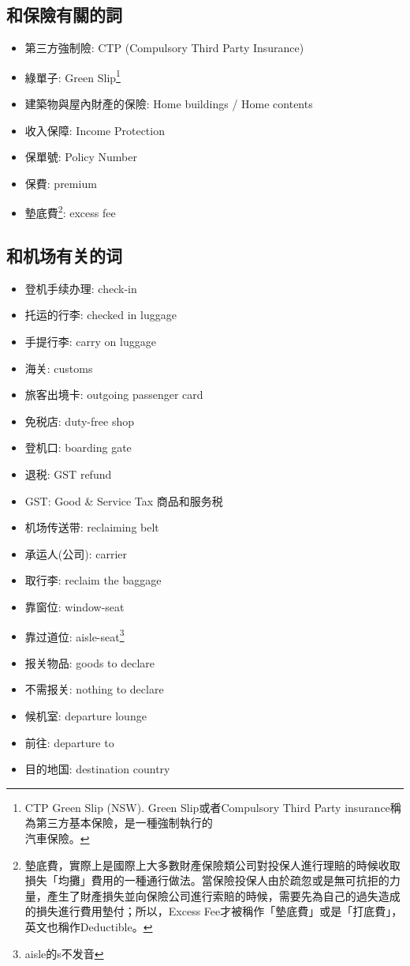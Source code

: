 \subsection{和保險有關的詞}
\begin{multicols}{2}
\begin{itemize}
  \itemsep0em
  \item 第三方強制險: CTP (Compulsory Third Party Insurance)
  \item 綠單子: Green Slip\footnote{CTP Green Slip (NSW). Green Slip或者Compulsory Third Party insurance稱為第三方基本保險，是一種強制執行的\\汽車保險。}
  \item 建築物與屋內財產的保險: Home buildings / Home contents
  \item 收入保障: Income Protection
  \item 保單號: Policy Number
  \item 保費: premium
  \item 墊底費\footnote{墊底費，實際上是國際上大多數財產保險類公司對投保人進行理賠的時候收取損失「均攤」費用的一種通行做法。當保險投保人由於疏忽或是無可抗拒的力量，產生了財產損失並向保險公司進行索賠的時候，需要先為自己的過失造成的損失進行費用墊付；所以，Excess Fee才被稱作「墊底費」或是「打底費」，英文也稱作Deductible。}: excess fee
\end{itemize}
\end{multicols}

\subsection{和机场有关的词}
\begin{multicols}{2}
\begin{itemize}
  \itemsep0em
  \item 登机手续办理: check-in
  \item 托运的行李: checked in luggage
  \item 手提行李: carry on luggage
  \item 海关: customs
  \item 旅客出境卡: outgoing passenger card
  \item 免税店: duty-free shop
  \item 登机口: boarding gate
  \item 退税: GST refund
  \item GST: Good \& Service Tax 商品和服务税
  \item 机场传送带: reclaiming belt
  \item 承运人(公司): carrier
  \item 取行李: reclaim the baggage
  \item 靠窗位: window-seat
  \item 靠过道位: aisle-seat\footnote{aisle的s不发音}
  \item 报关物品: goods to declare
  \item 不需报关: nothing to declare
  \item 候机室: departure lounge
  \item 前往: departure to
  \item 目的地国: destination country
\end{itemize}
\end{multicols}


